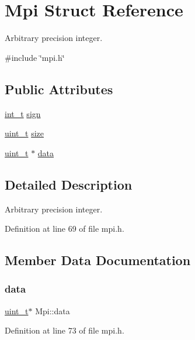 \hypertarget{structMpi}{}\section{Mpi Struct Reference}
\label{structMpi}


Arbitrary precision integer.  




{\ttfamily \#include \char`\"{}mpi.\+h\char`\"{}}

\subsection*{Public Attributes}
\begin{DoxyCompactItemize}
\item 
\hyperlink{compiler__port_8h_a022c65af7f6c8d3947e8a37d64db6ad6}{int\+\_\+t} \hyperlink{structMpi_ad220415cba342d58792ae2ea00ebe34a}{sign}
\item 
\hyperlink{compiler__port_8h_a12a1e9b3ce141648783a82445d02b58d}{uint\+\_\+t} \hyperlink{structMpi_ab7c94872ccb0b7a223c26fd3c43b0c4d}{size}
\item 
\hyperlink{compiler__port_8h_a12a1e9b3ce141648783a82445d02b58d}{uint\+\_\+t} $\ast$ \hyperlink{structMpi_a6277ee3b97f7ef362735a5d9cfa92235}{data}
\end{DoxyCompactItemize}


\subsection{Detailed Description}
Arbitrary precision integer. 

Definition at line 69 of file mpi.\+h.



\subsection{Member Data Documentation}
\mbox{\label{structMpi_a6277ee3b97f7ef362735a5d9cfa92235}} 
\subsubsection{\texorpdfstring{data}{data}}
{\footnotesize\ttfamily \hyperlink{compiler__port_8h_a12a1e9b3ce141648783a82445d02b58d}{uint\+\_\+t}$\ast$ Mpi\+::data}



Definition at line 73 of file mpi.\+h.


